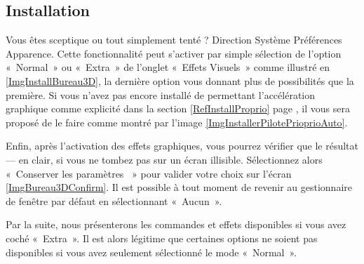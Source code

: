 \subsection{Installation}
Vous êtes sceptique ou tout simplement tenté ? Direction Système \FlecheDroite Préférences \FlecheDroite Apparence. Cette fonctionnalité peut s'activer par simple sélection de l'option «~Normal~» ou «~Extra~» de l'onglet «~Effets Visuels~» comme illustré en \ref{ImgInstallBureau3D}, la dernière option vous donnant plus de possibilités que la première. Si vous n'avez pas encore installé de  permettant l'accélération graphique comme explicité dans la section \ref{RefInstallProprio} page \pageref{RefInstallProprio}, il vous sera proposé de le faire comme montré par l'image \ref{ImgInstallerPilotePrioprioAuto}.\par
\InstallBureauTroisD
Enfin, après l'activation des effets graphiques, vous pourrez vérifier que le résultat --- en clair, si vous ne tombez pas sur un écran illisible. Sélectionnez alors «~Conserver les paramètres ~» pour valider votre choix sur l'écran \ref{ImgBureau3DConfirm}. Il est possible à tout moment de revenir au gestionnaire de fenêtre par défaut en sélectionnant «~Aucun~».
\begin{attention}
Par la suite, nous présenterons les commandes et effets disponibles si vous avez coché «~Extra~». Il est alors légitime que certaines options ne soient pas disponibles si vous avez seulement sélectionné le mode «~Normal~».
\end{attention}
